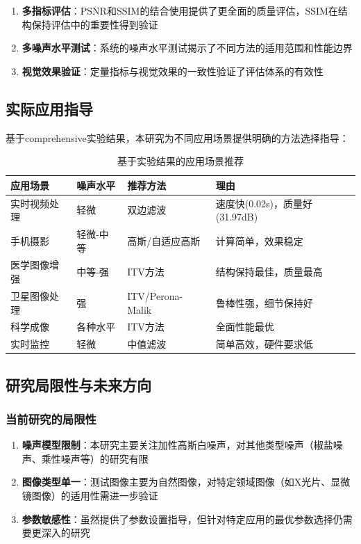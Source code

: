 \documentclass[a4paper,12pt]{ctexart}
\begin{document}
\begin{enumerate}
    \item \textbf{多指标评估}：PSNR和SSIM的结合使用提供了更全面的质量评估，SSIM在结构保持评估中的重要性得到验证

    \item \textbf{多噪声水平测试}：系统的噪声水平测试揭示了不同方法的适用范围和性能边界

    \item \textbf{视觉效果验证}：定量指标与视觉效果的一致性验证了评估体系的有效性
\end{enumerate}

\subsection{实际应用指导}

基于comprehensive实验结果，本研究为不同应用场景提供明确的方法选择指导：

\begin{table}[H]
\centering
\caption{基于实验结果的应用场景推荐}
\begin{tabular}{|l|l|l|l|}
\hline
\textbf{应用场景} & \textbf{噪声水平} & \textbf{推荐方法} & \textbf{理由} \\
\hline
实时视频处理 & 轻微 & 双边滤波 & 速度快(0.02s)，质量好(31.97dB) \\
\hline
手机摄影 & 轻微-中等 & 高斯/自适应高斯 & 计算简单，效果稳定 \\
\hline
医学图像增强 & 中等-强 & ITV方法 & 结构保持最佳，质量最高 \\
\hline
卫星图像处理 & 强 & ITV/Perona-Malik & 鲁棒性强，细节保持好 \\
\hline
科学成像 & 各种水平 & ITV方法 & 全面性能最优 \\
\hline
实时监控 & 轻微 & 中值滤波 & 简单高效，硬件要求低 \\
\hline
\end{tabular}
\end{table}

\subsection{研究局限性与未来方向}

\subsubsection{当前研究的局限性}

\begin{enumerate}
    \item \textbf{噪声模型限制}：本研究主要关注加性高斯白噪声，对其他类型噪声（椒盐噪声、乘性噪声等）的研究有限

    \item \textbf{图像类型单一}：测试图像主要为自然图像，对特定领域图像（如X光片、显微镜图像）的适用性需进一步验证

    \item \textbf{参数敏感性}：虽然提供了参数设置指导，但针对特定应用的最优参数选择仍需要更深入的研究
\end{enumerate}
\end{document}
